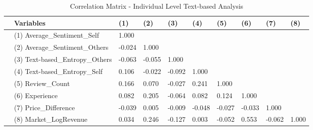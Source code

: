 \begin{table}[H]
\centering
\begin{tabular}{@{}llllllllll@{}}
\toprule
 & Variables                       & (1)    & (2)    & (3)    & (4)    & (5)    & (6)    & (7)       & (8)      \\ \midrule
 & (1) Average\_Sentiment\_Self    & 1.000  & \multicolumn{7}{l}{}                                              \\
 & (2) Average\_Sentiment\_Others  & -0.024 & 1.000  & \multicolumn{6}{l}{}                                     \\
 & (3) Text-based\_Entropy\_Others & -0.063 & -0.055 & 1.000  & \multicolumn{5}{l}{}                            \\
 & (4) Text-based\_Entropy\_Self   & 0.106  & -0.022 & -0.092 & 1.000  & \multicolumn{4}{l}{}                   \\
 & (5) Review\_Count               & 0.166  & 0.070  & -0.027 & 0.241  & 1.000  & \multicolumn{3}{l}{}          \\
 & (6) Experience                  & 0.082  & 0.205  & -0.064 & 0.082  & 0.124  & 1.000  & \multicolumn{2}{l}{} \\
 & (7) Price\_Difference           & -0.039 & 0.005  & -0.009 & -0.048 & -0.027 & -0.033 & 1.000     &          \\
 & (8) Market\_LogRevenue          & 0.034  & 0.246  & -0.127 & 0.003  & -0.052 & 0.553  & -0.062    & 1.000    \\ \bottomrule
\end{tabular}%
\caption{Correlation Matrix -  Individual Level Text-based Analysis }
\label{corr_ind_text}
\end{table} 